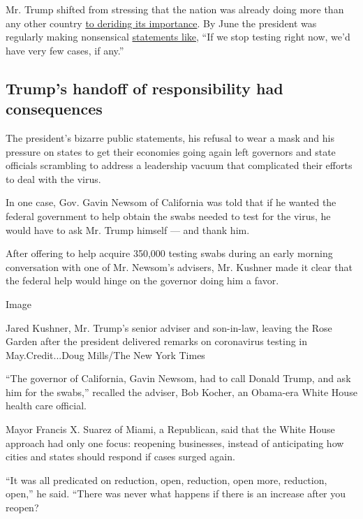 Mr. Trump shifted from stressing that the nation was already doing more
than any other country
\href{https://www.politico.com/news/2020/05/14/trump-coronavirus-testing-high-case-numbers-259524}{to
deriding its importance}. By June the president was regularly making
nonsensical
\href{https://www.youtube.com/watch?v=aN1eptTaWVM}{statements like},
``If we stop testing right now, we'd have very few cases, if any.''

\hypertarget{trumps-handoff-of-responsibility-had-consequences}{%
\subsection{Trump's handoff of responsibility had
consequences}\label{trumps-handoff-of-responsibility-had-consequences}}

The president's bizarre public statements, his refusal to wear a mask
and his pressure on states to get their economies going again left
governors and state officials scrambling to address a leadership vacuum
that complicated their efforts to deal with the virus.

In one case, Gov. Gavin Newsom of California was told that if he wanted
the federal government to help obtain the swabs needed to test for the
virus, he would have to ask Mr. Trump himself --- and thank him.

After offering to help acquire 350,000 testing swabs during an early
morning conversation with one of Mr. Newsom's advisers, Mr. Kushner made
it clear that the federal help would hinge on the governor doing him a
favor.

Image

Jared Kushner, Mr. Trump's senior adviser and son-in-law, leaving the
Rose Garden after the president delivered remarks on coronavirus testing
in May.Credit...Doug Mills/The New York Times

``The governor of California, Gavin Newsom, had to call Donald Trump,
and ask him for the swabs,'' recalled the adviser, Bob Kocher, an
Obama-era White House health care official.

Mayor Francis X. Suarez of Miami, a Republican, said that the White
House approach had only one focus: reopening businesses, instead of
anticipating how cities and states should respond if cases surged again.

``It was all predicated on reduction, open, reduction, open more,
reduction, open,'' he said. ``There was never what happens if there is
an increase after you reopen?

